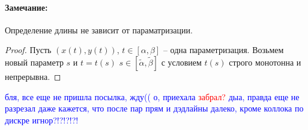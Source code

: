 \documentclass{article}
\theoremstyle{plain}
\theoremstyle{definition}
\theoremstyle{remark}
\renewcommand{\*}{\cdot}
\begin{document}
\paragraph{Замечание:} Определение длины не зависит от параматризации. 
\begin{proof}
Пусть $(x(t), y(t))$, $t\in [\alpha, \beta]$ -- одна параметризация. Возьмем новый параметр $s$ и $t=t(s)$ $s\in [\widetilde{\alpha}, \widetilde{\beta}]$ с условием $t(s)$ строго монотонна и непрерывна. 
\end{proof}

\textcolor{blue}{бля, все еще не пришла посылка, жду((}
\textcolor{blue}{о, приехала}
\textcolor{red}{забрал?}
\textcolor{blue}{дыа, правда еще не разрезал даже}
\textcolor{blue}{кажется, что после пар прям и дэдлайны далеко, кроме коллока по дискре}
\textcolor{blue}{игнор?!?!?!?!}
\end{document}
